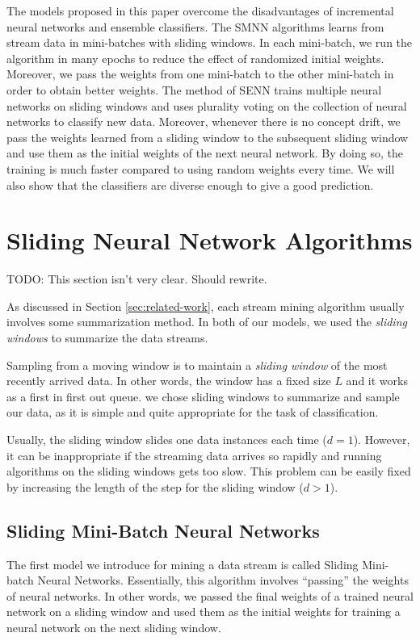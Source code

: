 \documentclass[conference]{IEEEtran}
\begin{document}
		
		The models proposed in this paper overcome the disadvantages of incremental neural networks and ensemble classifiers.  The SMNN algorithms learns from stream data in mini-batches with sliding windows. In each mini-batch, we run the algorithm in many epochs to reduce the effect of randomized initial weights. Moreover, we pass the weights from one mini-batch to the other mini-batch in order to obtain better weights. The method of SENN trains multiple neural networks on sliding windows and uses plurality voting on the collection of neural networks to classify new data. Moreover, whenever there is no concept drift, we pass the weights learned from a sliding window to the subsequent sliding window and use them as the initial weights of the next neural network. By doing so, the training  is much faster compared to using random weights every time. We will also show that the classifiers are diverse enough to give a good prediction. 
		
		\section{Sliding Neural Network Algorithms} 
		\label{sec:models}
		TODO: This section isn't very clear. Should rewrite.
		
		As discussed in Section \ref{sec:related-work}, each stream mining algorithm usually involves some summarization method. In both of our models,  we used the \emph{sliding windows} to summarize the data streams.
		
		Sampling from a moving window is to maintain a \emph{sliding window} of the most recently arrived data. In other words, the window has a fixed size $L$ and it works as a first in first out queue. we chose sliding windows to summarize and sample our data, as it is simple and quite appropriate for the task of classification. 
		
		Usually, the sliding window slides one data instances each time ($d=1$). However, it can be inappropriate if the streaming data arrives so rapidly and running algorithms on the sliding windows gets too slow. This problem can be easily fixed by increasing the length of the step for the sliding window ($d>1$).  
		
		\subsection{Sliding Mini-Batch Neural Networks}
		The first model we introduce for mining a data stream is called Sliding Mini-batch Neural Networks. Essentially, this algorithm involves ``passing'' the weights of neural networks. In other words, we passed the final weights of a trained neural network on a sliding window and used them as the initial weights for training a neural network on the next sliding window.
\end{document}
